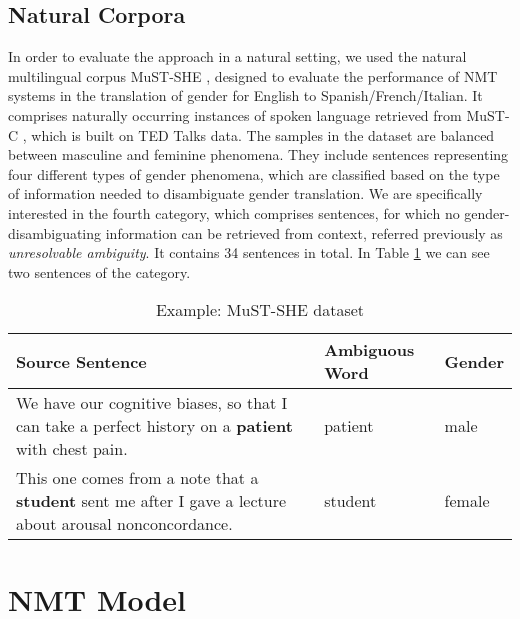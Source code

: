 \subsection{Natural Corpora}
\label{sec:Setup:Natural_Corpora}

In order to evaluate the approach in a natural setting, we used the natural multilingual corpus MuST-SHE \parencite{MuST-SHE}, designed to evaluate the performance of NMT systems in the translation of gender for English to Spanish/French/Italian. It comprises naturally occurring instances of spoken language retrieved from MuST-C \parencite{MuST-C}, which is built on TED Talks data. The samples in the dataset are balanced between masculine and feminine phenomena. They include sentences representing four different types of gender phenomena, which are classified based
on the type of information needed to disambiguate gender translation. We are specifically interested in the fourth category, which comprises sentences, for which no gender-disambiguating information can be retrieved from context, referred previously as \textit{unresolvable ambiguity}. It contains 34 sentences in total. In Table \ref{tab:mustshe} we can see two sentences of the category. 

\begin{table}[!htb]
    \begin{tabularx}{\linewidth}{|X|l|l|}
        \hline
        \textbf{Source Sentence} & \textbf{Ambiguous Word} & \textbf{Gender} \\ \hline
        We have our cognitive biases, so that I can take a perfect history on a \textbf{patient} with chest pain. & patient & male \\ \hline
        This one comes from a note that a \textbf{student} sent me after I gave a lecture about arousal nonconcordance. & student & female \\ \hline
    \end{tabularx}
    \caption{Example: MuST-SHE dataset}
    \label{tab:mustshe}
\end{table}

\section{NMT Model}
\label{sec:Setup:Models}


